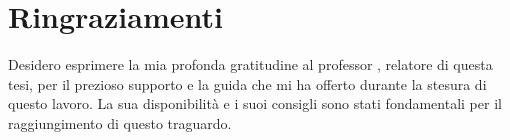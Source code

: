\cleardoublepage
{}
{}

%
%
%
%
%
%
%
%
%
\bigskip

\begingroup
\let\clearpage\relax
\let\cleardoublepage\relax
\let\cleardoublepage\relax

\chapter*{Ringraziamenti}
\noindent Desidero esprimere la mia profonda gratitudine al professor \myProf, relatore di questa tesi, per il prezioso supporto e la guida che mi ha offerto durante la stesura di questo lavoro. La sua disponibilità e i suoi consigli sono stati fondamentali per il raggiungimento di questo traguardo.


